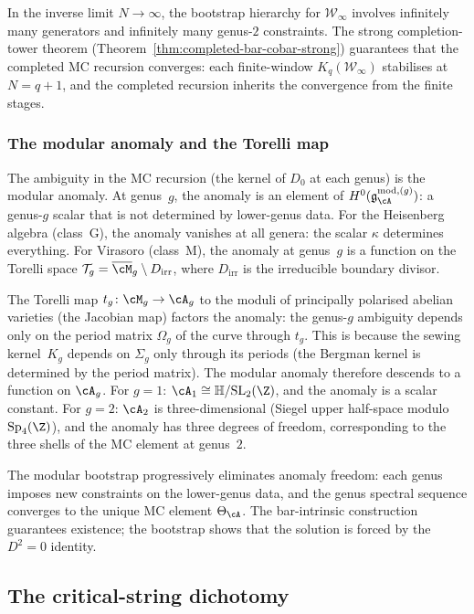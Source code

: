 In the inverse limit $N\to\infty$, the bootstrap hierarchy for
$\mathcal W_\infty$ involves infinitely many generators and
infinitely many genus-$2$ constraints. The strong
completion-tower theorem (Theorem~\ref{thm:completed-bar-cobar-strong})
guarantees that the completed MC recursion converges: each
finite-window $K_q(\mathcal W_\infty)$ stabilises at
$N=q+1$, and the completed recursion inherits the convergence
from the finite stages.

\subsubsection*{The modular anomaly and the Torelli map}

The ambiguity in the MC recursion (the kernel of $D_0$ at each
genus) is the modular anomaly. At genus~$g$, the anomaly is an
element of $H^0(\mathfrak{g}_{\cA}^{\mathrm{mod},(g)})$: a genus-$g$ scalar that is not
determined by lower-genus data. For the Heisenberg algebra
(class~G), the anomaly vanishes at all genera: the scalar
$\kappa$ determines everything. For Virasoro (class~M), the
anomaly at genus~$g$ is a function on the Torelli space
$\mathcal{T}_g=\overline{\cM}_g\setminus D_{\mathrm{irr}}$, where
$D_{\mathrm{irr}}$ is the irreducible boundary divisor.

The Torelli map $t_g\colon\cM_g\to\cA_g$ to the moduli of
principally polarised abelian varieties (the Jacobian map)
factors the anomaly: the genus-$g$ ambiguity depends only on
the period matrix $\Omega_g$ of the curve through
$t_g$. This is because the sewing kernel~$K_g$ depends on
$\Sigma_g$ only through its periods (the Bergman kernel is
determined by the period matrix). The modular anomaly therefore
descends to a function on $\cA_g$. For $g=1$:
$\cA_1\cong\mathbb H/\mathrm{SL}_2(\Z)$, and the anomaly is
a scalar constant. For $g=2$: $\cA_2$ is three-dimensional
(Siegel upper half-space modulo $\mathrm{Sp}_4(\Z)$), and the
anomaly has three degrees of freedom, corresponding to the
three shells of the MC element at genus~$2$.

The modular bootstrap progressively eliminates anomaly freedom:
each genus imposes new constraints on the lower-genus data, and
the genus spectral sequence converges to the unique MC element
$\Theta_\cA$. The bar-intrinsic construction guarantees
existence; the bootstrap shows that the solution is forced by
the $D^2=0$ identity.


\subsection*{The critical-string dichotomy}

